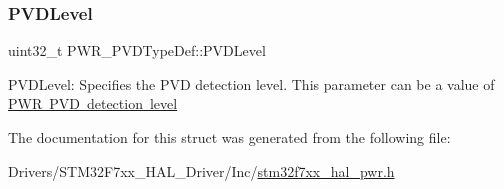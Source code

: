 \subsubsection{\texorpdfstring{PVDLevel}{PVDLevel}}
{\footnotesize\ttfamily uint32\+\_\+t P\+W\+R\+\_\+\+P\+V\+D\+Type\+Def\+::\+P\+V\+D\+Level}

P\+V\+D\+Level\+: Specifies the P\+VD detection level. This parameter can be a value of \mbox{\hyperlink{group___p_w_r___p_v_d__detection__level}{P\+WR P\+VD detection level}} 

The documentation for this struct was generated from the following file\+:\begin{DoxyCompactItemize}
\item 
Drivers/\+S\+T\+M32\+F7xx\+\_\+\+H\+A\+L\+\_\+\+Driver/\+Inc/\mbox{\hyperlink{stm32f7xx__hal__pwr_8h}{stm32f7xx\+\_\+hal\+\_\+pwr.\+h}}\end{DoxyCompactItemize}
